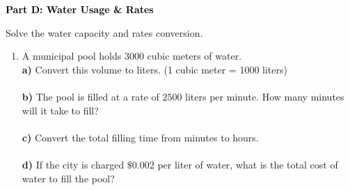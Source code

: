 \documentclass[12pt, letterpaper, fleqn]{article}
\newcommand{\blanklong}{\underline{\hspace{6.5cm}}}
\begin{document}
\newpage

\begin{tcolorbox}[colback=black!10]
    \large\textcolor{black}{\textbf{Part D: Water Usage \& Rates}}
\end{tcolorbox}

\vspace{3mm}

\noindent
Solve the water capacity and rates conversion.

\vspace{5mm}

\begin{enumerate}[itemsep=2.5cm, leftmargin=0.6cm]
\item A municipal pool holds $3000$ cubic meters of water. \\
\textbf{a)} Convert this volume to liters. (1 cubic meter = 1000 liters) \\
\blanklong \\
\textbf{b)} The pool is filled at a rate of $2500$ liters per minute. How many minutes will it take to fill? \\
\blanklong \\
\textbf{c)} Convert the total filling time from minutes to hours. \\
\blanklong \\
\textbf{d)} If the city is charged $\$0.002$ per liter of water, what is the total cost of water to fill the pool? \\
\blanklong
\end{enumerate}
\end{document}
